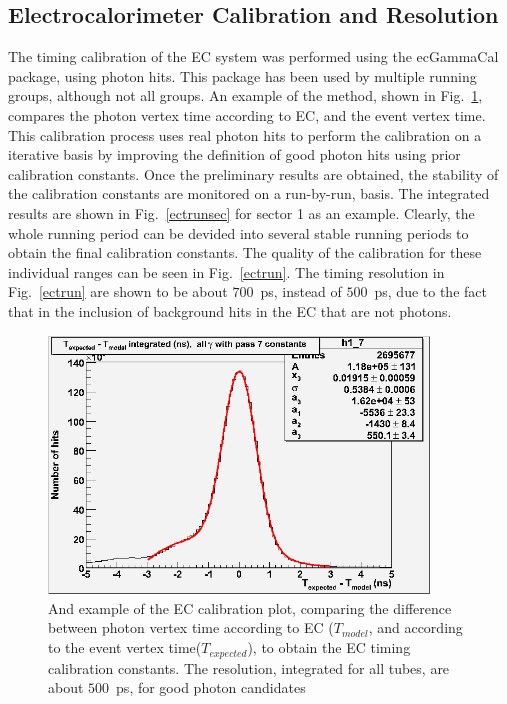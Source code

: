 \subsection{\label{sec:calib.ec}Electrocalorimeter Calibration and Resolution}
The timing calibration of the EC system was performed using the ecGammaCal package, using photon hits. This package has been used by multiple running groups, although not all groups. An example of the method, shown in Fig.~\ref{ectall}, compares the photon vertex time according to EC, and the event vertex time. This calibration process uses real photon hits to perform the calibration on a iterative basis by improving the definition of good photon hits using prior calibration constants. Once the preliminary results are obtained, the stability of the calibration constants are monitored on a run-by-run, basis. The integrated results are  shown in Fig.~\ref{ectrunsec} for sector 1 as an example. Clearly, the whole running period can be devided into several stable running periods to obtain the final calibration constants. The quality of the calibration for these individual ranges can be seen in Fig.~\ref{ectrun}. The timing resolution in Fig.~\ref{ectrun} are shown to be about $700$~ps, instead of $500$~ps, due to the fact that in the inclusion of background hits in the EC that are not photons.  

\begin{figure}[h]
\begin{center}
 \includegraphics[width=0.9\textwidth]{figures/calib/ec/ec_vtimeall.png}
  \caption{And example of the EC calibration plot, comparing  the difference between photon vertex time according to EC ($T_{model}$, and according to the event vertex time($T_{expected}$), to obtain the EC timing calibration constants. The resolution, integrated for all tubes, are about $500$~ps, for good photon candidates}
  \label{ectall}
  \end{center}
\end{figure}


